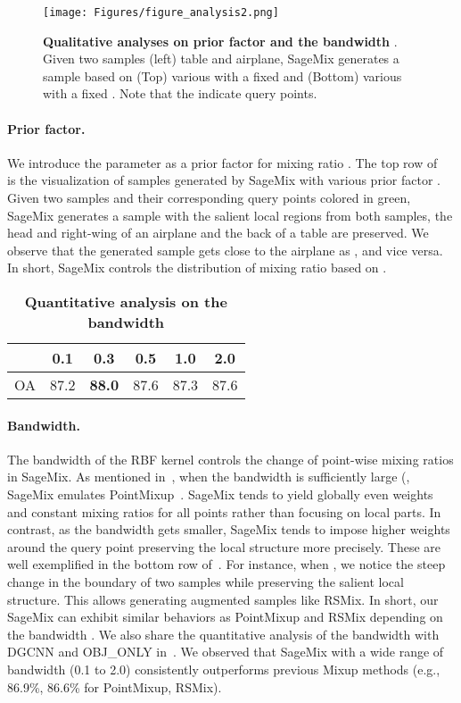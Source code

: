 \documentclass{article}
\begin{document}
\begin{figure}[t]
\centering
\texttt{[image: Figures/figure\_analysis2.png]}
\caption{\textbf{Qualitative analyses on prior factor  and the bandwidth }. 
Given two samples (left) table and airplane, SageMix generates a sample based on (Top) various  with a fixed  and (Bottom) various  with a fixed . 
Note that the  indicate query points.
}
\label{fig:figure_analysis} 
\end{figure} \paragraph{Prior factor.} We introduce the parameter  as a prior factor for mixing ratio . 
The top row of ~ is the visualization of samples generated by SageMix with various prior factor . 
Given two samples and their corresponding query points colored in green, SageMix generates a sample with the salient local regions from both samples, \eg the head and right-wing of an airplane and the back of a table are preserved. 
We observe that the generated sample gets close to the airplane as , and vice versa. In short, SageMix controls the distribution of mixing ratio  based on .

\begin{table}[t!]
  \centering 
  \setlength{\tabcolsep}{8pt}
  \renewcommand{\arraystretch}{1.1}
  \caption{\textbf{Quantitative analysis on the bandwidth }}
  \label{table:bandwidth} 
  \begin{tabular}{c|ccccc}
  \toprule
   & 0.1 & 0.3 & 0.5 & 1.0 & 2.0 \\
  \midrule
  \midrule
  OA & 87.2 & \textbf{88.0} & 87.6 & 87.3 & 87.6 \\
  \bottomrule
  \end{tabular}
  
\end{table}  \paragraph{Bandwidth.} The bandwidth  of the RBF kernel controls the change of point-wise mixing ratios in SageMix. 
As mentioned in~, when the bandwidth is sufficiently large (, SageMix emulates PointMixup~\cite{chen2020pointmixup}.
SageMix tends to yield globally even weights and constant mixing ratios for all points rather than focusing on local parts. 
In contrast, as the bandwidth gets smaller, SageMix tends to impose higher weights around the query point preserving the local structure more precisely. 
These are well exemplified in the bottom row of~. For instance, when , we notice the steep change in the boundary of two samples while preserving the salient local structure. 
This allows generating augmented samples like RSMix.
In short, our SageMix can exhibit similar behaviors as PointMixup and RSMix depending on the bandwidth . 
We also share the quantitative analysis of the bandwidth with DGCNN and OBJ\_ONLY in~. We observed that SageMix with a wide range of bandwidth  (0.1 to 2.0) consistently outperforms previous Mixup methods (e.g., 86.9\%, 86.6\% for PointMixup, RSMix). 
\end{document}

